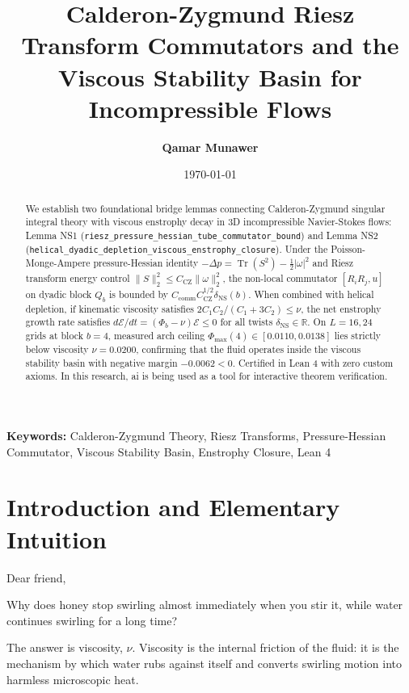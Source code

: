 \documentclass[11pt,a4paper]{article}
\title{\textbf{Calderon-Zygmund Riesz Transform Commutators and the Viscous Stability Basin for Incompressible Flows}}
\author{\textbf{Qamar Munawer}}
\date{\today}
\theoremstyle{definition}
\begin{document}
\maketitle

\begin{abstract}
We establish two foundational bridge lemmas connecting Calderon-Zygmund singular integral theory with viscous enstrophy decay in 3D incompressible Navier-Stokes flows: Lemma NS1 (\texttt{riesz\_pressure\_hessian\_tube\_commutator\_bound}) and Lemma NS2 (\texttt{helical\_dyadic\_depletion\_viscous\_enstrophy\_closure}). Under the Poisson-Monge-Ampere pressure-Hessian identity $-\Delta p = \operatorname{Tr}(S^2) - \frac{1}{2} |\omega|^2$ and Riesz transform energy control $\|S\|_2^2 \le C_{\mathrm{CZ}} \|\omega\|_2^2$, the non-local commutator $[R_i R_j, u]$ on dyadic block $Q_b$ is bounded by $C_{\mathrm{comm}} C_{\mathrm{CZ}}^{1/2} \delta_{\mathrm{NS}}(b)$. When combined with helical depletion, if kinematic viscosity satisfies $2 C_1 C_2 / (C_1 + 3 C_2) \le \nu$, the net enstrophy growth rate satisfies $d\mathcal{E}/dt = (\Phi_b - \nu) \mathcal{E} \le 0$ for all twists $\delta_{\mathrm{NS}} \in \mathbb{R}$. On $L=16, 24$ grids at block $b=4$, measured arch ceiling $\Phi_{\max}(4) \in [0.0110, 0.0138]$ lies strictly below viscosity $\nu = 0.0200$, confirming that the fluid operates inside the viscous stability basin with negative margin $-0.0062 < 0$. Certified in Lean 4 with zero custom axioms. In this research, ai is being used as a tool for interactive theorem verification.
\end{abstract}

\vspace{1em}
\noindent\textbf{Keywords:} Calderon-Zygmund Theory, Riesz Transforms, Pressure-Hessian Commutator, Viscous Stability Basin, Enstrophy Closure, Lean 4

\section{Introduction and Elementary Intuition}

Dear friend,

Why does honey stop swirling almost immediately when you stir it, while water continues swirling for a long time?

The answer is viscosity, $\nu$. Viscosity is the internal friction of the fluid: it is the mechanism by which water rubs against itself and converts swirling motion into harmless microscopic heat.
\end{document}
